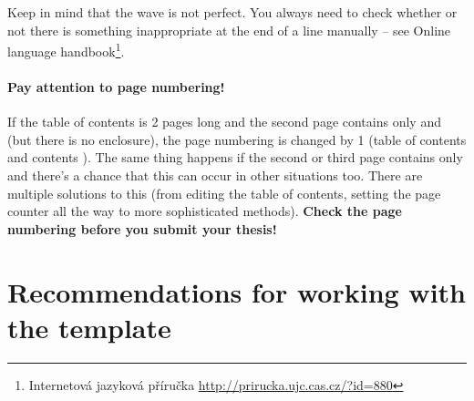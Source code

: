 Keep in mind that the wave is not perfect. You always need to check whether or not there is something inappropriate at the end of a line manually -- see Online language handbook\footnote{Internetová jazyková příručka \url{http://prirucka.ujc.cas.cz/?id=880}}.


\paragraph {Pay attention to page numbering!} If the table of contents is 2 pages long and the second page contains only  and  (but there is no enclosure), the page numbering is changed by 1 (table of contents and contents ). The same thing happens if the second or third page contains only  and there's a chance that this can occur in other situations too. There are multiple solutions to this (from editing the table of contents, setting the page counter all the way to more sophisticated methods). \textbf{Check the page numbering before you submit your thesis!}

\section*{Recommendations for working with the template}

